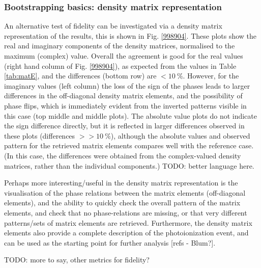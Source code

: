 \subsubsection{Bootstrapping basics: density matrix representation}

An alternative test of fidelity can be investigated via a density matrix representation of the results, this is shown in Fig. \ref{998904}. These plots show the real and imaginary components of the density matrices, normalised to the maximum (complex) value. Overall the agreement is good for the real values (right hand column of Fig. \ref{998904}), as expected from the values in Table \ref{tab:matE}, and the differences (bottom row) are $<10~\%$. However, for the imaginary values (left column) the loss of the sign of the phases leads to larger differences in the off-diagonal density matrix elements, and the possibility of phase flips, which is immediately evident from the inverted patterns visible in this case (top middle and middle plots). The absolute value plots do not indicate the sign difference directly, but it is reflected in larger differences observed in these plots (differences $>>10~\%$), although the absolute values and observed pattern for the retrieved matrix elements compares well with the reference case. (In this case, the differences were obtained from the complex-valued density matrices, rather than the individual components.) TODO: better language here.

Perhaps more interesting/useful in the density matrix representation is the visualisation of the phase relations between the matrix elements (off-diagonal elements), and the ability to quickly check the overall pattern of the matrix elements, and check that no phase-relations are missing, or that very different patterns/sets of matrix elements are retrieved. Furthermore, the density matrix elements also provide a complete description of the photoionization event, and can be used as the starting point for further analysis [refs - Blum?].

TODO: more to say, other metrics for fidelity?

